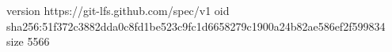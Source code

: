 version https://git-lfs.github.com/spec/v1
oid sha256:51f372c3882dda0c8fd1be523c9fc1d6658279c1900a24b82ae586ef2f599834
size 5566
